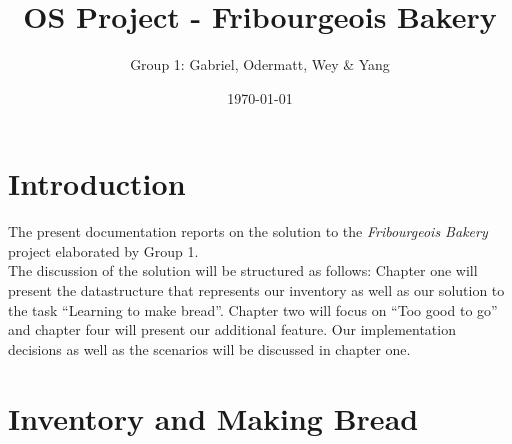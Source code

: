 \documentclass[11pt]{article}
\author{Group 1: Gabriel, Odermatt, Wey \& Yang}
\date{\today}
\title{OS Project - Fribourgeois Bakery}
\begin{document}
\maketitle
\tableofcontents

\setlength\parindent{0pt}

\section{Introduction}
\label{sec:org5f1f83f}

The present documentation reports on the solution to the \emph{Fribourgeois Bakery} project elaborated by Group 1.\\

The discussion of the solution will be structured as follows: Chapter one will present the datastructure that represents our inventory as well as our solution to the task ``Learning to make bread''. Chapter two will focus on ``Too good to go'' and chapter four will present our additional feature. Our implementation decisions as well as the scenarios will be discussed in chapter one.\\

\section{Inventory and Making Bread}
\label{sec:org61be58e}
\end{document}

